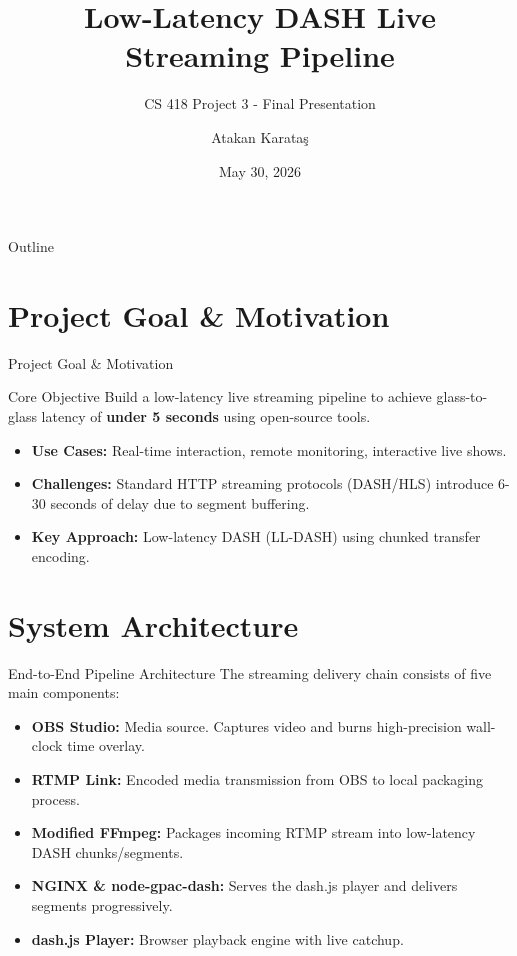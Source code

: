 \documentclass{beamer}
\title[Low-Latency DASH Streaming]{Low-Latency DASH Live Streaming Pipeline}
\subtitle{CS 418 Project 3 - Final Presentation}
\author[Atakan Karata\c{s}]{Atakan Karata\c{s}}
\institute[Özye\v{g}in University]{
    Department of Computer Engineering\\
    \"{O}zye\v{g}in University, Istanbul, Turkey
}
\date[May 2026]{May 30, 2026}
\begin{document}
\begin{frame}
    \titlepage
\end{frame}

\begin{frame}{Outline}
    \tableofcontents
\end{frame}

\section{Project Goal \& Motivation}

\begin{frame}{Project Goal \& Motivation}
    \begin{block}{Core Objective}
        Build a low-latency live streaming pipeline to achieve glass-to-glass latency of \textbf{under 5 seconds} using open-source tools.
    \end{block}
    \vspace{0.2cm}
    \begin{itemize}
        \item \textbf{Use Cases:} Real-time interaction, remote monitoring, interactive live shows.
        \item \textbf{Challenges:} Standard HTTP streaming protocols (DASH/HLS) introduce 6-30 seconds of delay due to segment buffering.
        \item \textbf{Key Approach:} Low-latency DASH (LL-DASH) using chunked transfer encoding.
    \end{itemize}
\end{frame}

\section{System Architecture}

\begin{frame}{End-to-End Pipeline Architecture}
    The streaming delivery chain consists of five main components:
    \vspace{0.2cm}
    \begin{itemize}
        \item \textbf{OBS Studio:} Media source. Captures video and burns high-precision wall-clock time overlay.
        \item \textbf{RTMP Link:} Encoded media transmission from OBS to local packaging process.
        \item \textbf{Modified FFmpeg:} Packages incoming RTMP stream into low-latency DASH chunks/segments.
        \item \textbf{NGINX \& node-gpac-dash:} Serves the dash.js player and delivers segments progressively.
        \item \textbf{dash.js Player:} Browser playback engine with live catchup.
    \end{itemize}
\end{frame}
\end{document}
